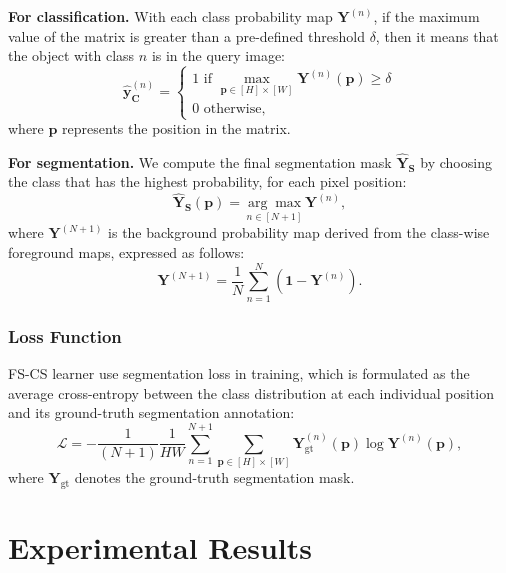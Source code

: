 \documentclass{ieeeaccess}
\newcommand{\congtt}[1]{\textcolor{red}{#1}}
\begin{document}
\textbf{For classification.} With each class probability map $\mathbf{Y}^{(n)}$, if the maximum value of the matrix is greater than a pre-defined threshold $\delta$, then it means that the object with class $n$ is in the query image:
\begin{equation}
\hat{\mathbf{y}}_{\mathbf{C}}^{(n)}=\left\{\begin{array}{l}
1 \text { if } \max _{\mathbf{p} \in[H] \times[W]} \mathbf{Y}^{(n)}(\mathbf{p}) \geq \delta \\
0 \text { otherwise, }
\end{array}\right.
\end{equation}
where $\mathbf{p}$ represents the position in the matrix.


\textbf{For segmentation.} We compute the final segmentation mask $\hat{\mathbf{Y}}_{\mathbf{S}}$ by choosing the class that has the highest probability, for each pixel position:
\begin{equation}
\hat{\mathbf{Y}}_{\mathbf{S}}(\mathbf{p})=\underset{n \in[N+1]}{\arg \max } \mathbf{Y}^{(n)}, %
\end{equation}
where $\mathbf{Y}^{(N+1)}$ is the background probability map derived from the class-wise foreground maps, expressed as follows:
\begin{equation}
\mathbf{Y}^{(N+1)}=\frac{1}{N} \sum_{n=1}^{N}\left(\mathbf{1}-\mathbf{Y}^{(n)}\right).
\label{eq6}
\end{equation}



\subsubsection{Loss Function }
FS-CS learner use segmentation loss in training, which is formulated as the average cross-entropy between the class distribution at each individual position and its ground-truth segmentation annotation:
\begin{equation}
\mathcal{L}=-\frac{1}{(N+1)} \frac{1}{H W} \sum_{n=1}^{N+1} \sum_{\mathbf{p} \in[H] \times[W]} \mathbf{Y}_{\mathrm{gt}}^{(n)}(\mathbf{p}) \log \mathbf{Y}^{(n)}(\mathbf{p}),
\end{equation}
where $\mathbf{Y}_{\mathrm{gt}}$ denotes the ground-truth segmentation mask.%


\section{Experimental Results}
\label{sec:guidelines}
\end{document}
